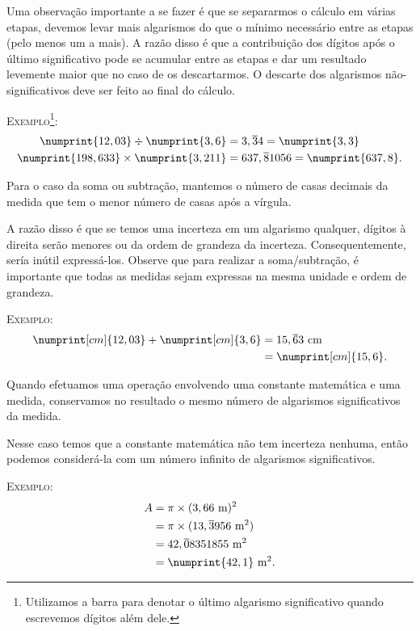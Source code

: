 \begin{description}
	Uma observação importante a se fazer é que se separarmos o cálculo em várias etapas, devemos levar mais algarismos do que o mínimo necessário entre as etapas (pelo menos um a mais). A razão disso é que a contribuição dos dígitos após o último significativo pode se acumular entre as etapas e dar um resultado levemente maior que no caso de os descartarmos. O descarte dos algarismos não-significativos deve ser feito ao final do cálculo.
		
	\textsc{Exemplo}\footnote{Utilizamos a barra para denotar o último algarismo significativo quando escrevemos dígitos além dele.}:
\begin{subequations}\label{Eq:AlgarismosSignificativosMult}
\begin{align}
     \numprint{12,03} \div \numprint{3,6} &= 3,\overline{3}4 = \numprint{3,3} \\
     \numprint{198,633} \times \numprint{3,211} &= 637,\overline{8}1056 = \numprint{637,8}.
\end{align}
\end{subequations}

	\item[Soma e subtração] Para o caso da soma ou subtração, mantemos o número de casas decimais da medida que tem o menor número de casas após a vírgula. 
	
	A razão disso é que se temos uma incerteza em um algarismo qualquer, dígitos à direita serão menores ou da ordem de grandeza da incerteza. Consequentemente, sería inútil expressá-los. Observe que para realizar a soma/subtração, é importante que todas as medidas sejam expressas na mesma unidade e ordem de grandeza.
	
	\textsc{Exemplo:}
\begin{align}
	 \numprint[cm]{12,03} + \numprint[cm]{3,6} &= 15,\overline{6}3~\textrm{cm}\\
		 &= \numprint[cm]{15,6}.
\end{align}

	\item[Constantes] Quando efetuamos uma operação envolvendo uma constante matemática e uma medida, conservamos no resultado o mesmo número de algarismos significativos da medida. 
	
	Nesse caso temos que a constante matemática não tem incerteza nenhuma, então podemos considerá-la com um número infinito de algarismos significativos.
	
	\textsc{Exemplo:}
\begin{align}
	A &= \pi \times (3,66~\textrm{m})^2 \\
	  &= \pi \times (13,\overline{3}956~\textrm{m}^2)\\
	  &= 42,\overline{0}8351855~\textrm{m}^2 \\
	  &= \numprint{42,1}~\textrm{m}^2.
\end{align}


\end{description}
